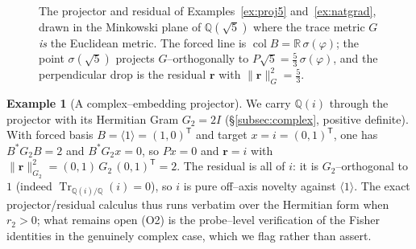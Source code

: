 \documentclass[11pt]{article}
\theoremstyle{plain}
\theoremstyle{definition}
\newtheorem{example}[theorem]{Example}
\theoremstyle{remark}
\newcommand{\Q}{\mathbb{Q}}
\newcommand{\R}{\mathbb{R}}
\newcommand{\Tr}{\operatorname{Tr}}
\newcommand{\rr}{\mathbf{r}}
\newcommand{\GG}{G}
\newcommand{\BB}{B}
\newcommand{\transpose}{^{\mathsf{T}}}
\DeclareMathOperator{\col}{col}
\begin{document}
\begin{figure}[ht]
\centering
{}
\caption{The projector and residual of Examples~\ref{ex:proj5} and~\ref{ex:natgrad}, drawn in the Minkowski
plane of $\Q(\sqrt5)$ where the trace metric $\GG$ \emph{is} the Euclidean metric. The forced line is
$\col\BB=\R\,\sigma(\varphi)$; the point $\sigma(\sqrt5)$ projects $\GG$--orthogonally to
$P\sqrt5=\tfrac53\,\sigma(\varphi)$, and the perpendicular drop is the residual $\rr$ with
$\lVert\rr\rVert_{\GG}^2=\tfrac53$.}
\label{fig:proj}
\end{figure}

\begin{example}[A complex--embedding projector]\label{ex:complexproj}
We carry $\Q(i)$ through the projector with its Hermitian Gram $G_2=2I$ (\S\ref{subsec:complex}, positive
definite). With forced basis $\BB=\langle 1\rangle=(1,0)\transpose$ and target $x=i=(0,1)\transpose$, one has
$\BB^{*}G_2\BB=2$ and $\BB^{*}G_2 x=0$, so $Px=0$ and $\rr=i$ with
$\lVert\rr\rVert_{G_2}^2=(0,1)\,G_2\,(0,1)\transpose=2$. The residual is all of $i$: it is $G_2$--orthogonal to
$1$ (indeed $\Tr_{\Q(i)/\Q}(i)=0$), so $i$ is pure off--axis novelty against $\langle1\rangle$. The exact
projector/residual calculus thus runs verbatim over the Hermitian form when $r_2>0$; what remains open (O2) is
the probe--level verification of the Fisher identities in the genuinely complex case, which we flag rather
than assert.
\end{example}
\end{document}
